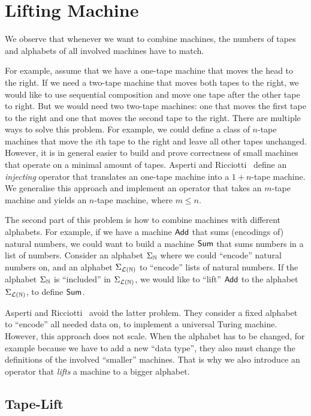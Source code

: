 \chapter{Lifting Machine}
\label{chap:lifting}

We observe that whenever we want to combine machines, the numbers of tapes and alphabets of all involved machines have to match.

For example, assume that we have a one-tape machine that moves the head to the right.  If we need a two-tape machine that moves both tapes to the
right, we would like to use sequential composition and move one tape after the other tape to right.  But we would need two two-tape machines: one that
moves the first tape to the right and one that moves the second tape to the right.  There are multiple ways to solve this problem.  For example, we
could define a class of $n$-tape machines that move the $i$th tape to the right and leave all other tapes unchanged.  However, it is in general easier
to build and prove correctness of small machines that operate on a minimal amount of tapes.  Asperti and Ricciotti~\cite{asperti2015} define an
\emph{injecting} operator that translates an one-tape machine into a $1+n$-tape machine.  We generalise this approach and implement an operator that
takes an $m$-tape machine and yields an $n$-tape machine, where $m \le n$.

The second part of this problem is how to combine machines with different alphabets.  For example, if we have a machine $\textsf{Add}$ that sums
(encodings of) natural numbers, we could want to build a machine $\textsf{Sum}$ that sums numbers in a list of numbers.  Consider an alphabet
$\Sigma_{\mathbb{N}}$ where we could ``encode'' natural numbers on, and an alphabet $\Sigma_{\mathcal{L}(\mathbb{N})}$ to ``encode'' lists of natural numbers.  If the
alphabet $\Sigma_{\mathbb{N}}$ is ``included'' in $\Sigma_{\mathcal{L}(\mathbb{N})}$, we would like to ``lift'' $\textsf{Add}$ to the alphabet $\Sigma_{\mathcal{L}(\mathbb{N})}$, to
define $\textsf{Sum}$.

Asperti and Ricciotti~\cite{asperti2015} avoid the latter problem.  They consider a fixed alphabet to ``encode'' all needed data on, to implement a
universal Turing machine.  However, this approach does not scale.  When the alphabet has to be changed, for example because we have to add a new
``data type'', they also must change the definitions of the involved ``smaller'' machines.  That is why we also introduce an operator that
\emph{lifts} a machine to a bigger alphabet.

\section{Tape-Lift}
\label{sec:n-Lift}

